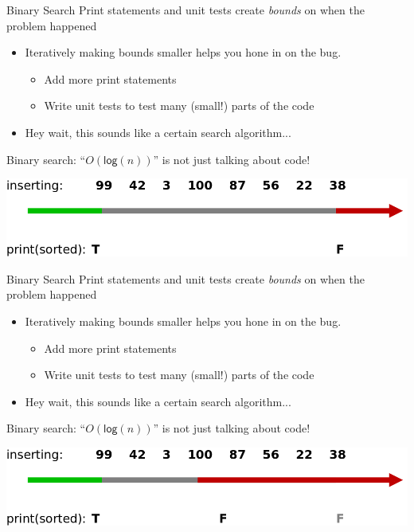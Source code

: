 \documentclass[xcolor=dvipsnames]{beamer}
\begin{document}
\begin{frame}{Binary Search}
	Print statements and unit tests create {\em bounds} on when the problem happened
	\begin{itemize}
		\item Iteratively making bounds smaller helps you hone in on the bug.
		\begin{itemize}
			\item Add more print statements
			\item Write unit tests to test many (small!) parts of the code
		\end{itemize}
		\item Hey wait, this sounds like a certain search algorithm...
	\end{itemize}
	\pause
	Binary search: ``$O(\mathsf{log}(n))$'' is not just talking about code!
	\linegap
	\pause

	\includegraphics[width=\textwidth]{binary1.png}
\end{frame}
\begin{frame}{Binary Search}
	Print statements and unit tests create {\em bounds} on when the problem happened
	\begin{itemize}
		\item Iteratively making bounds smaller helps you hone in on the bug.
		\begin{itemize}
			\item Add more print statements
			\item Write unit tests to test many (small!) parts of the code
		\end{itemize}
		\item Hey wait, this sounds like a certain search algorithm...
	\end{itemize}
	Binary search: ``$O(\mathsf{log}(n))$'' is not just talking about code!
	\linegap

	\includegraphics[width=\textwidth]{binary2.png}
\end{frame}
\end{document}
